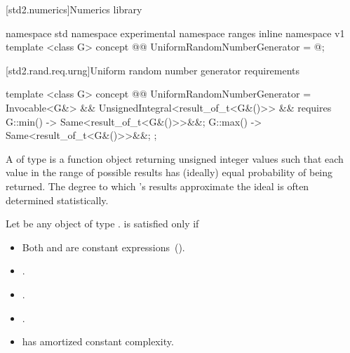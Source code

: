 [std2.numerics]{Numerics library}


\begin{codeblock}
namespace std { namespace experimental { namespace ranges { inline namespace v1 {
  template <class G>
  concept @@ UniformRandomNumberGenerator = @\seebelow@;
}}}}
\end{codeblock}


[std2.rand.req.urng]{Uniform random number generator requirements}%
%

\begin{codeblock}
template <class G>
concept @@ UniformRandomNumberGenerator =
  Invocable<G&> &&
  UnsignedIntegral<result_of_t<G&()>> &&
  requires {
    { G::min() } -> Same<result_of_t<G&()>>&&;
    { G::max() } -> Same<result_of_t<G&()>>&&;
  };
\end{codeblock}

\pnum
A 
 of type 
is a function object
returning unsigned integer values
such that each value
in the range of possible results
has (ideally) equal probability
of being returned.
\enternote
 The degree to which 's results
 approximate the ideal
 is often determined statistically.
\exitnote

\pnum
Let  be any object of type .
 is satisfied only if

\begin{itemize}
\item Both  and  are constant expressions~().
\item {}.
\item {}.
\item {}.
\item {} has amortized constant complexity.
\end{itemize}
